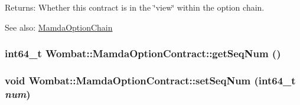\begin{Desc}
\item[Returns:]Whether this contract is in the \char`\"{}view\char`\"{} within the option chain.\end{Desc}
\begin{Desc}
\item[See also:]\hyperlink{classWombat_1_1MamdaOptionChain}{Mamda\-Option\-Chain} \end{Desc}
\hypertarget{classWombat_1_1MamdaOptionContract_dc8dfd209bc57a9b248180bcba1dccf3}{
\subsubsection[getSeqNum]{\setlength{\rightskip}{0pt plus 5cm}int64\_\-t Wombat::Mamda\-Option\-Contract::get\-Seq\-Num ()}}
\label{classWombat_1_1MamdaOptionContract_dc8dfd209bc57a9b248180bcba1dccf3}


\hypertarget{classWombat_1_1MamdaOptionContract_b3fb00be49aa058bd98b12d21a535f9e}{
\subsubsection[setSeqNum]{\setlength{\rightskip}{0pt plus 5cm}void Wombat::Mamda\-Option\-Contract::set\-Seq\-Num (int64\_\-t {\em num})}}
\label{classWombat_1_1MamdaOptionContract_b3fb00be49aa058bd98b12d21a535f9e}


